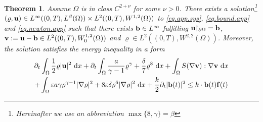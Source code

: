 \documentclass{article}
\newcommand{\bb}{{\bf b}}
\newcommand{\vb}{\bb}
\newcommand{\vf}{{\bf f}}
\newcommand{\bu}{{\bf u}}
\newcommand{\vu}{\bu}
\newcommand{\bv}{{\bf v}}
\newcommand{\vv}{\bv}
\newcommand{\pat}{\partial_t}
\newtheorem{theorem}{Theorem}[section]
\numberwithin{equation}{section}
\begin{document}
\begin{theorem}\label{app.exist}
Assume $\Omega$ is in class $C^{2+\nu}$ for some $\nu>0$. There exists a solution\footnote{Hereinafter we use an abbreviation ${\max\{8,\gamma\}} = \beta$} $(\varrho,\vu)\in L^\infty((0,T),L^\beta(\Omega))\times L^2((0,T),W^{1,2}(\Omega))$ to \eqref{eq.app.sys}, \eqref{eq.bound.app} and \eqref{eq.newton.app} such that there exists $\vb\in L^\infty$ fulfilling
$
\vu{\restriction_{\partial\Omega}} = \vb
$, $\vv := \vu - \vb\in L^2((0,T),W^{1,2}_0(\Omega))$ and $\varrho\in L^2((0,T),W^{2,2}(\Omega))$. Moreover, the solution satisfies the energy inequality in a form
\begin{multline}\label{ene.ineq.app}
\pat \int_\Omega \frac 12 \varrho |\vu|^2\ {\rm d}x + \pat \int_\Omega \frac a{\gamma-1}\varrho^\gamma + \frac \delta7\varrho^8\ {\rm d}x + \int_\Omega S(\nabla\vv):\nabla\vv\ {\rm d}x\\
%
 + \int_\Omega \varepsilon a\gamma\varrho^{\gamma-1}|\nabla\varrho|^2 + 8 \varepsilon\delta \varrho^6|\nabla\varrho|^2\ {\rm d}x
+ \frac k2 \pat |\vb(t)|^2  
\leq k\cdot\vb(t)\vf(t)
\end{multline}
\end{theorem}
\end{document}

